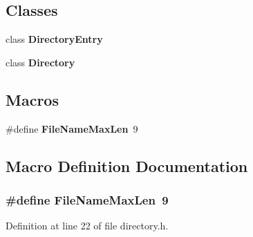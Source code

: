 \subsection*{Classes}
\begin{DoxyCompactItemize}
\item 
class {\bf Directory\+Entry}
\item 
class {\bf Directory}
\end{DoxyCompactItemize}
\subsection*{Macros}
\begin{DoxyCompactItemize}
\item 
\#define {\bf File\+Name\+Max\+Len}~9
\end{DoxyCompactItemize}


\subsection{Macro Definition Documentation}
\subsubsection[{File\+Name\+Max\+Len}]{\setlength{\rightskip}{0pt plus 5cm}\#define File\+Name\+Max\+Len~9}\label{directory_8h_a66ff406ace4e6725f5986d9b8d4a5ebd}


Definition at line 22 of file directory.\+h.

